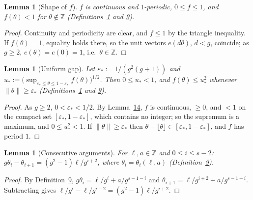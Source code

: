 \documentclass[11pt]{article}
\newcounter{hffc}
\theoremstyle{definition}\newtheorem{hffdef}[hffc]{Definition}
\theoremstyle{plain}\newtheorem{hfflem}[hffc]{Lemma}\newtheorem{hffthm}[hffc]{Theorem}
\theoremstyle{remark}\newtheorem{hffrem}[hffc]{Remark}
\newcommand{\hffcost}{}
\newcommand{\setcost}[1]{\renewcommand{\hffcost}{#1}}
\newcommand{\Z}{\mathbb{Z}}\newcommand{\R}{\mathbb{R}}\newcommand{\N}{\mathbb{N}}
\begin{document}
\begin{hfflem}[Shape of $f$]\label{L:f}
$f$ is continuous and $1$-periodic, $0\le f\le1$, and $f(\theta)<1$ for $\theta\notin\Z$ (Definitions~\hyperref[D:conv]{1} and \hyperref[D:psi]{9}).
\par\nopagebreak{}
\end{hfflem}
\begin{proof}\setcost{length 152/300}Continuity and periodicity are clear, and $f\le1$ by the triangle inequality. If $f(\theta)=1$, equality holds there, so the unit vectors $e(d\theta)$, $d<g$, coincide; as $g\ge2$, $e(\theta)=e(0)=1$, i.e.\ $\theta\in\Z$.
\end{proof}

\begin{hfflem}[Uniform gap]\label{L:gap}
Let $\varepsilon_*:=1/(g^2(g+1))$ and $u_*:=\bigl(\sup_{\varepsilon_*\le\theta\le1-\varepsilon_*}f(\theta)\bigr)^{1/2}$. Then $0\le u_*<1$, and $f(\theta)\le u_*^2$ whenever $\|\theta\|\ge\varepsilon_*$ (Definitions~\hyperref[D:conv]{1} and \hyperref[D:psi]{9}).
\par\nopagebreak{}
\end{hfflem}
\begin{proof}\setcost{length 173/300}As $g\ge2$, $0<\varepsilon_*<1/2$. By Lemma~\hyperref[L:f]{14}, $f$ is continuous, $\ge0$, and $<1$ on the compact set $[\varepsilon_*,1-\varepsilon_*]$, which contains no integer; so the supremum is a maximum, and $0\le u_*^2<1$. If $\|\theta\|\ge\varepsilon_*$ then $\theta-\lfloor\theta\rfloor\in[\varepsilon_*,1-\varepsilon_*]$, and $f$ has period $1$.
\end{proof}

\begin{hfflem}[Consecutive arguments]\label{L:ident}
For $\ell,a\in\Z$ and $0\le i\le s-2$: $g\theta_i-\theta_{i+1}=(g^2-1)\ell/g^{i+2}$, where $\theta_i=\theta_i(\ell,a)$ (Definition~\hyperref[D:psi]{9}).
\par\nopagebreak{}
\end{hfflem}
\begin{proof}\setcost{length 96/300}By Definition~\hyperref[D:psi]{9}, $g\theta_i=\ell/g^{i}+a/g^{s-1-i}$ and $\theta_{i+1}=\ell/g^{i+2}+a/g^{s-1-i}$. Subtracting gives $\ell/g^i-\ell/g^{i+2}=(g^2-1)\ell/g^{i+2}$.
\end{proof}
\end{document}
